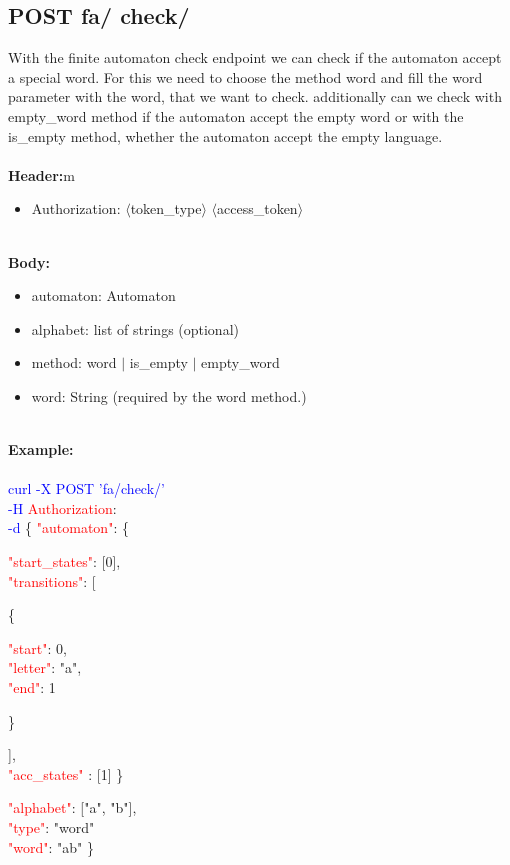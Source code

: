 \subsection{POST fa/ check/}
With the finite automaton check endpoint we can check if the automaton accept a special word. For this we need to choose the method word and fill the word parameter with the word, that we want to check. additionally can we check with empty\_word method if the automaton accept the empty word or with the is\_empty method, whether the automaton accept the empty language.\\
\ \\
\textbf{Header:}m
\begin{itemize}
    \item Authorization: $\langle$token\_type$\rangle$ $\langle$access\_token$\rangle$
\end{itemize}
\ \\
\textbf{Body:}
\begin{itemize}
    \item automaton: Automaton
    \item alphabet: list of strings (optional)
    \item method: word $|$ is\_empty $|$ empty\_word
    \item word: String (required by the word method.)
\end{itemize}
\ \\
\textbf{Example:} \\
\ \\
\textcolor{blue}{curl -X POST '\BaseURL fa/check/'\\
-H} \textcolor{red}{Authorization}: \Auth \\
\textcolor{blue}{-d} \{ 
     \textcolor{red}{"automaton"}: \{
     \begin{adjustwidth}{7.5 mm}{0 cm}
     \begin{adjustwidth}{7.5 mm}{0 cm}
            \textcolor{red}{"start\_states"}: [0],\\
            \textcolor{red}{"transitions"}: [
            \begin{adjustwidth}{7.5 mm}{0 cm}
            \{
               \begin{adjustwidth}{7.5 mm}{0 cm}
                    \textcolor{red}{"start"}: 0,\\
                    \textcolor{red}{"letter"}: "a",\\
                    \textcolor{red}{"end"}: 1
               \end{adjustwidth}
            \}
            \end{adjustwidth}
            ],\\
        \textcolor{red}{"acc\_states" }: [1]  \}
    \end{adjustwidth}
    \end{adjustwidth}
   \begin{adjustwidth}{7.5 mm}{0 cm}
    \textcolor{red}{"alphabet"}: ["a", "b"],\\
    \textcolor{red}{"type"}: "word"\\
    \textcolor{red}{"word"}: "ab" \}
    \end{adjustwidth}
     
